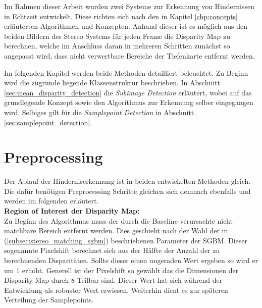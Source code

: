Im Rahmen dieser Arbeit wurden zwei Systeme zur Erkennung von Hindernissen in Echtzeit entwickelt. Diese richten sich nach den in Kapitel \ref{chp:concepts} erläuterten Algorithmen und Konzepten. Anhand dieser ist es möglich aus den beiden Bildern des Stereo Systems für jeden Frame die Disparity Map zu berechnen, welche im Anschluss daran in mehreren Schritten zunächst so angepasst wird, dass nicht verwertbare Bereiche der Tiefenkarte entfernt werden.

\noindent
Im folgenden Kapitel werden beide Methoden detailliert beleuchtet. Zu Beginn wird die zugrunde liegende Klassenstruktur beschrieben. In Abschnitt \ref{sec:mean_disparity_detection} die \emph{Subimage Detection} erläutert, wobei auf das grundlegende Konzept sowie den Algorithmus zur Erkennung selber eingegangen wird. Selbiges gilt für die \emph{Samplepoint Detection} in Abschnitt \ref{sec:samplepoint_detection}.


\section{Preprocessing}
\label{sec:preprocessing}
Der Ablauf der Hinderniserkennung ist in beiden entwickelten Methoden gleich. Die dafür benötigen Preprocessing Schritte gleichen sich demnach ebenfalls und werden im folgenden erläutert.\\

\noindent
\textbf{Region of Interest der Disparity Map:}\\
Zu Beginn des Algorithmus muss der durch die Baseline verursachte nicht matchbare Bereich entfernt werden. Dies geschieht nach der Wahl der in (\ref{subsec:stereo_matching_sgbm}) beschriebenen Parameter der SGBM. Dieser sogenannte Pixelshift berechnet sich aus der Hälfte der Anzahl der zu berechnenden Disparitäten. Sollte dieser einen ungeraden Wert ergeben so wird er um 1 erhöht. Generell ist der Pixelshift so gewählt das die Dimensionen der Disparity Map durch 8 Teilbar sind. Dieser Wert hat sich während der Entwicklung als robuster Wert erwiesen. Weiterhin dient es zur späteren Verteilung der Samplepoints.\\

